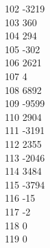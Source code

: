{ 102	-3219 \\
 103	360 \\
 104	294 \\
 105	-302 \\
 106	2621 \\
 107	4 \\
 108	6892 \\
 109	-9599 \\
 110	2904 \\
 111	-3191 \\
 112	2355 \\
 113	-2046 \\
 114	3484 \\
 115	-3794 \\
 116	-15 \\
 117	-2 \\
 118	0 \\
 119	0 \\
}
